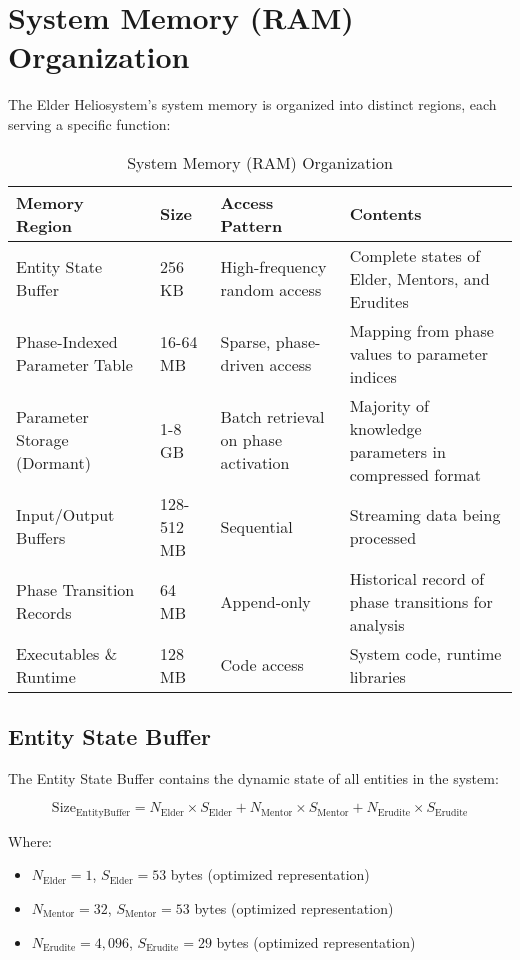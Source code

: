 \section{System Memory (RAM) Organization}

The Elder Heliosystem's system memory is organized into distinct regions, each serving a specific function:

\begin{table}[h]
\centering
\small
\begin{tabular}{|p{3.5cm}|p{3cm}|p{3cm}|p{4cm}|}
\hline
\textbf{Memory Region} & \textbf{Size} & \textbf{Access Pattern} & \textbf{Contents} \\
\hline
Entity State Buffer & 256 KB & High-frequency random access & Complete states of Elder, Mentors, and Erudites \\
\hline
Phase-Indexed Parameter Table & 16-64 MB & Sparse, phase-driven access & Mapping from phase values to parameter indices \\
\hline
Parameter Storage (Dormant) & 1-8 GB & Batch retrieval on phase activation & Majority of knowledge parameters in compressed format \\
\hline
Input/Output Buffers & 128-512 MB & Sequential & Streaming data being processed \\
\hline
Phase Transition Records & 64 MB & Append-only & Historical record of phase transitions for analysis \\
\hline
Executables \& Runtime & 128 MB & Code access & System code, runtime libraries \\
\hline
\end{tabular}
\caption{System Memory (RAM) Organization}
\end{table}

\subsection{Entity State Buffer}

The Entity State Buffer contains the dynamic state of all entities in the system:

\begin{equation}
\text{Size}_{\text{EntityBuffer}} = N_{\text{Elder}} \times S_{\text{Elder}} + N_{\text{Mentor}} \times S_{\text{Mentor}} + N_{\text{Erudite}} \times S_{\text{Erudite}}
\end{equation}

Where:
\begin{itemize}
    \item $N_{\text{Elder}} = 1$, $S_{\text{Elder}} = 53$ bytes (optimized representation)
    \item $N_{\text{Mentor}} = 32$, $S_{\text{Mentor}} = 53$ bytes (optimized representation)
    \item $N_{\text{Erudite}} = 4,096$, $S_{\text{Erudite}} = 29$ bytes (optimized representation)
\end{itemize}

